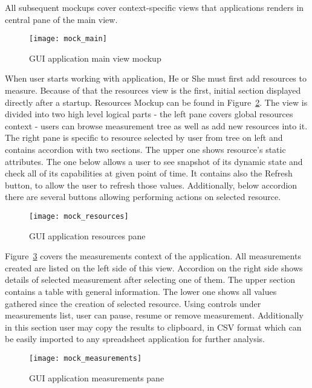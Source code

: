 All subsequent mockups cover context-specific views that applications renders in central pane of the main view.

\begin{figure}[ht]
\centering
\texttt{[image: mock\_main]}
\caption{GUI application main view mockup}
\label{fig:mock_main}
\end{figure}

When user starts working with application, He or She must first add resources to measure. Because of that the resources view is the first, initial section displayed directly after a startup. Resources Mockup can be found in Figure~\ref{fig:mock_resources}. The view is divided into two high level logical parts - the left pane covers global resources context - users can browse measurement tree as well as add new resources into it. The right pane is specific to resource selected by user from tree on left and contains accordion with two sections. The upper one shows resource\rq{}s static attributes. The one below allows a user to see snapshot of its dynamic state and check all of its capabilities at given point of time. It contains also the Refresh button, to allow the user to refresh those values. Additionally, below accordion there are several buttons allowing performing actions on selected resource.

\begin{figure}[ht]
\centering
\texttt{[image: mock\_resources]}
\caption{GUI application resources pane}
\label{fig:mock_resources}
\end{figure}

Figure~\ref{fig:mock_measurements} covers the measurements context of the application. All measurements created are listed on the left side of this view. Accordion on the right side shows details of selected measurement after selecting one of them. The upper section contains a table with general information. The lower one shows all values gathered since the creation of selected resource. Using controls under measurements list, user can pause, resume or remove measurement. Additionally in this section user may copy the results to clipboard, in CSV format which can be easily imported to any spreadsheet application for further analysis.

\begin{figure}[ht]
\centering
\texttt{[image: mock\_measurements]}
\caption{GUI application measurements pane}
\label{fig:mock_measurements}
\end{figure}

